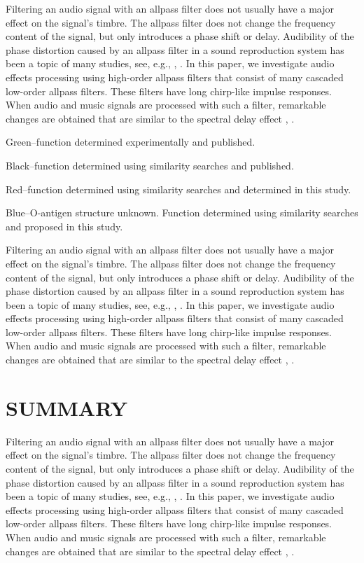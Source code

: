 \documentclass{aes2e}
\begin{document}
Filtering an audio signal with an allpass filter does not usually have a major effect on the signal's timbre. The allpass filter does not change the frequency content of the signal, but only introduces a phase shift or delay. Audibility of the phase distortion caused by an allpass filter in a sound reproduction system has been a topic of many studies, see, e.g., \cite{DEK1}, \cite{DEK2}. In this paper, we investigate audio effects processing using high-order allpass filters that consist of many cascaded low-order allpass filters. These filters have long chirp-like impulse responses. When audio and music signals are processed with such a filter, remarkable changes are obtained that are similar to the spectral delay effect  \cite{DEK3}, \cite{DEK4}.
\begin{unnumlist}
\item{}Green--function determined experimentally and published.
\item{}Black--function determined using similarity searches and published.
\item{}Red--function determined using similarity searches and determined in this study.
\item{}Blue--O-antigen structure unknown. Function determined using similarity searches and proposed in this study.
\end{unnumlist}
Filtering an audio signal with an allpass filter does not usually have a major effect on the signal's timbre. The allpass filter does not change the frequency content of the signal, but only introduces a phase shift or delay. Audibility of the phase distortion caused by an allpass filter in a sound reproduction system has been a topic of many studies, see, e.g., \cite{DEK1}, \cite{DEK2}. In this paper, we investigate audio effects processing using high-order allpass filters that consist of many cascaded low-order allpass filters. These filters have long chirp-like impulse responses. When audio and music signals are processed with such a filter, remarkable changes are obtained that are similar to the spectral delay effect  \cite{DEK3}, \cite{DEK4}.

\section{SUMMARY}
Filtering an audio signal with an allpass filter does not usually have a major effect on the signal's timbre. The allpass filter does not change the frequency content of the signal, but only introduces a phase shift or delay. Audibility of the phase distortion caused by an allpass filter in a sound reproduction system has been a topic of many studies, see, e.g., \cite{DEK1}, \cite{DEK2}. In this paper, we investigate audio effects processing using high-order allpass filters that consist of many cascaded low-order allpass filters. These filters have long chirp-like impulse responses. When audio and music signals are processed with such a filter, remarkable changes are obtained that are similar to the spectral delay effect  \cite{DEK3}, \cite{DEK4}.
\end{document}
